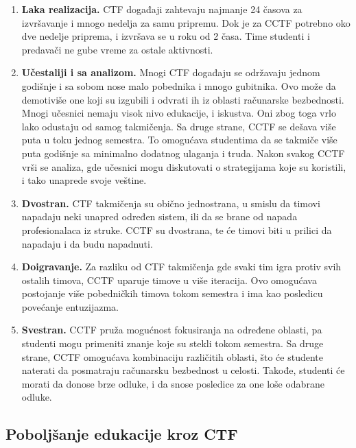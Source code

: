 \documentclass[12pt, a4paper, twocolumn]{article}
\begin{document}
\begin{enumerate}
    \item \textbf{Laka realizacija.} CTF događaji zahtevaju najmanje 24 časova 
        za izvršavanje i mnogo nedelja za samu pripremu. Dok je za CCTF 
        potrebno oko dve nedelje priprema, i izvršava se u roku od 2 časa. 
        Time studenti i predavači ne gube vreme za ostale aktivnosti.
    \item \textbf{Učestaliji i sa analizom.} Mnogi CTF događaju se održavaju
        jednom godišnje i sa sobom nose malo pobednika i mnogo gubitnika.
        Ovo može da demotiviše one koji su izgubili i odvrati ih iz oblasti
        računarske bezbednosti. Mnogi učesnici nemaju visok nivo edukacije,
        i iskustva. Oni zbog toga vrlo lako odustaju od samog takmičenja.
        Sa druge strane, CCTF se dešava više puta u toku jednog semestra.
        To omogućava studentima da se takmiče više puta godišnje sa minimalno
        dodatnog ulaganja i truda. Nakon svakog CCTF vrši se analiza, gde
        učesnici mogu diskutovati o strategijama koje su koristili, i tako
        unaprede svoje veštine.
    \item \textbf{Dvostran.}
        CTF takmičenja su obično jednostrana, u smislu da timovi napadaju
        neki unapred određen sistem, ili da se brane od napada profesionalaca
        iz struke. CCTF su dvostrana, te će timovi biti u prilici da napadaju
        i da budu napadnuti. 
    \item \textbf{Doigravanje.}
        Za razliku od CTF takmičenja gde svaki tim igra protiv svih ostalih
        timova, CCTF uparuje timove u više iteracija. Ovo omogućava postojanje
        više pobedničkih timova tokom semestra i ima kao posledicu povećanje
        entuzijazma.
    \item \textbf{Svestran.}
        CCTF pruža mogućnost fokusiranja na određene oblasti, pa studenti
        mogu primeniti znanje koje su stekli tokom semestra. Sa druge strane,
        CCTF omogućava kombinaciju različitih oblasti, što će studente 
        naterati da posmatraju računarsku bezbednost u celosti. Takođe, 
        studenti će morati da donose brze odluke, i da snose posledice za one
        loše odabrane odluke.
\end{enumerate}

\subsection{Poboljšanje edukacije kroz CTF}
\end{document}
